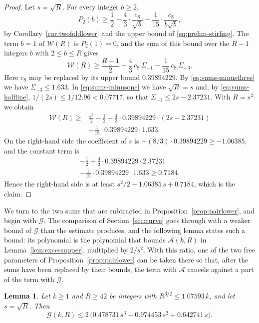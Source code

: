 \documentclass{amsart}
\makeatletter
\newtheorem{lemma}[theorem]{Lemma}
\theoremstyle{definition}
\theoremstyle{remark}
\numberwithin{equation}{section}
\def\subsection{\@startsection{subsection}{2}\z@{.5\linespacing\@plus.7\linespacing}{-.5em}{\normalfont\bfseries\boldmath}}
\makeatother
\begin{document}
\begin{proof}
Let $s=\sqrt R$. For every integer $b\ge2$,
\[
P_2(b)\ge\frac12-\frac43\cdot\frac{c_{\mathrm S}}{\sqrt b}
-\frac1{15}\cdot\frac{c_{\mathrm S}}{b\sqrt b},
\]
by Corollary~\ref{cor:twofoldlower} and the upper bound of
\eqref{eq:prelim-stirling}. The term $b=1$ of $\mathcal W(R)$ is $P_2(1)=0$, and the
sum of this bound over the $R-1$ integers $b$ with
$2\le b\le R$ gives
\[
\mathcal W(R)\ge\frac{R-1}2-\frac43\,c_{\mathrm S}\,\Sigma_{-1}
-\frac1{15}\,c_{\mathrm S}\,\Sigma_{-3}.
\]
Here $c_{\mathrm S}$ may be replaced by its upper bound $0.39894229$. By
\eqref{eq:sums-minusthree} we have $\Sigma_{-3}\le1.633$. In
\eqref{eq:sums-minusone} we have $\sqrt R=s$ and, by
\eqref{eq:sums-halfline}, $1/(2s)\le1/12.96<0.07717$, so that
$\Sigma_{-1}\le2s-2.37231$. With $R=s^2$ we obtain
\begin{align*}
\mathcal W(R)\ge{}&\frac{s^2}2-\frac12
-\frac43\cdot0.39894229\cdot(2s-2.37231)\\
&-\frac1{15}\cdot0.39894229\cdot1.633 .
\end{align*}
On the right-hand side the coefficient of $s$ is
$-(8/3)\cdot0.39894229\ge-1.06385$, and the constant term is
\begin{multline*}
-\frac12+\frac43\cdot0.39894229\cdot2.37231\\
-\frac1{15}\cdot0.39894229\cdot1.633\ge0.7184 .
\end{multline*}
Hence the right-hand side is at least $s^2/2-1.06385\,s+0.7184$, which is
the claim.
\end{proof}

\subsection{The sum $\mathcal G$}\label{subsec:sums-log}

We turn to the two sums that are subtracted in
Proposition~\ref{prop:pairlower}, and begin with $\mathcal G$. The
comparison of Section~\ref{sec:curve} goes through with a weaker bound of
$\mathcal G$ than the estimate produces, and the following lemma states such
a bound: its polynomial is the polynomial that bounds $\mathcal A(k,R)$ in
Lemma~\ref{lem:excessupper}, multiplied by $2/s^2$. With this ratio, one of
the two free parameters of Proposition~\ref{prop:pairlower} can be taken
there so that, after the sums have been replaced by their bounds, the term
with $\mathcal A$ cancels against a part of the term with $\mathcal G$.

\begin{lemma}\label{lem:logupper}
Let $k\ge1$ and $R\ge42$ be integers with $R^{3/2}\le1.07593\,k$, and let
$s=\sqrt R$. Then
\[
\mathcal G(k,R)\le2\,\bigl(0.478731\,s^3-0.974453\,s^2+0.642741\,s\bigr).
\]
\end{lemma}
\end{document}
